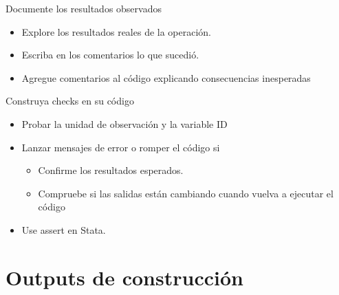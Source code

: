 \documentclass[10pt, aspectratio=169, compress]{beamer}
\begin{document}
\begin{frame}{Documente los resultados observados}
	\begin{itemize}
		\item Explore los resultados reales de la operación.
		\item Escriba en los comentarios lo que sucedió.
		\item Agregue comentarios al código explicando consecuencias inesperadas
	\end{itemize}
\end{frame}

\begin{frame}{Construya checks en su código}
	\begin{itemize}
		\item Probar la unidad de observación y la variable ID
		\item Lanzar mensajes de error o romper el código si
		\begin{itemize}
			\item Confirme los resultados esperados.
			\item Compruebe si las salidas están cambiando cuando vuelva a ejecutar el código
		\end{itemize}
		\item Use assert en Stata.
	\end{itemize}
\end{frame}
\section{Outputs de construcción}
\end{document}
